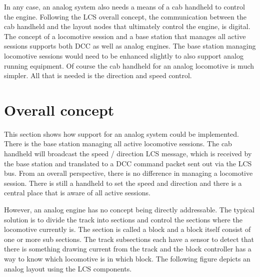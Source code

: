 In any case, an analog system also needs a means of a cab handheld to control the engine. Following the LCS overall concept, the communication between the cab handheld and the layout nodes that ultimately control the engine, is digital. The concept of a locomotive session and a base station that manages all active sessions supports both DCC as well as analog engines. The base station managing locomotive sessions would need to be enhanced slightly to also support analog running equipment. Of course the cab handheld for an analog locomotive is much simpler. All that is needed is the direction and speed control.

\section{Overall concept}

This section shows how support for an analog system could be implemented. There is the base station managing all active locomotive sessions. The cab handheld will broadcast the speed / direction LCS message, which is received by the base station and translated to a DCC command packet sent out via the LCS bus. From an overall perspective, there is no difference in managing a locomotive session. There is still a handheld to set the speed and direction and there is a central place that is aware of all active sessions.

However, an analog engine has no concept being directly addressable. The typical solution is to divide the track into sections and control the sections where the locomotive currently is. The section is called a block and a block itself consist of one or more sub sections. The track subsections each have a sensor to detect that there is something drawing current from the track and the block controller has a way to know which locomotive is in which block. The following figure depicts an analog layout using the LCS components.

